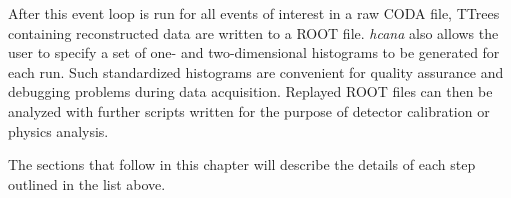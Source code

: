 

After this event loop is run for all events of interest in a raw CODA file,
TTrees containing reconstructed data are written to a ROOT file.
\textit{hcana} also allows the user to specify a set of one- and
two-dimensional histograms to be generated for each run.
Such standardized histograms are convenient for quality assurance and debugging
problems during data acquisition.
Replayed ROOT files can then be analyzed with further scripts written for the
purpose of detector calibration or physics analysis.


The sections that follow in this chapter will describe the details of each step
outlined in the list above.
